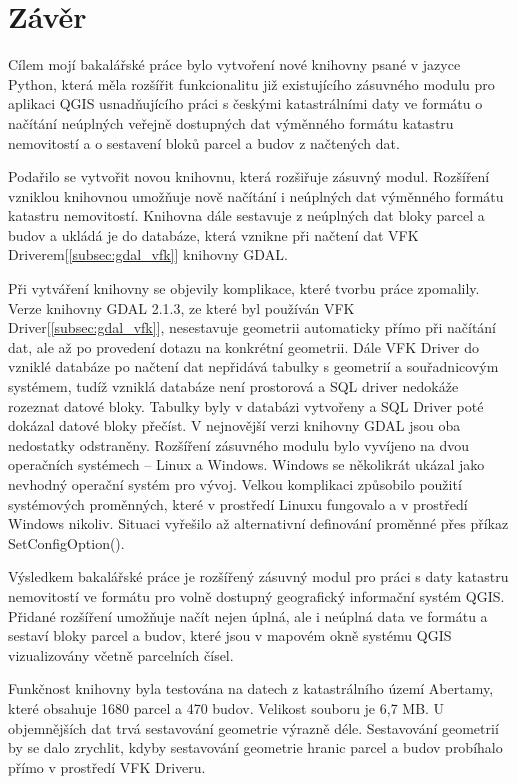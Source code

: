 \chapter{Závěr}
\label{5-zaver}
Cílem mojí bakalářské práce bylo vytvoření nové knihovny psané v jazyce Python, která měla rozšířit funkcionalitu již existujícího zásuvného modulu pro aplikaci QGIS usnadňujícího práci s českými katastrálními daty ve formátu  o načítání neúplných veřejně dostupných dat výměnného formátu katastru nemovitostí a o sestavení bloků parcel a budov z načtených dat.

Podařilo se vytvořit novou knihovnu, která rozšiřuje zásuvný modul. Rozšíření vzniklou knihovnou umožňuje nově načítání i neúplných dat výměnného formátu katastru nemovitostí. Knihovna dále sestavuje z neúplných dat bloky parcel a budov a ukládá je do databáze, která vznikne při načtení dat VFK Driverem[\ref{subsec:gdal_vfk}] knihovny GDAL.

Při vytváření knihovny se objevily komplikace, které tvorbu práce zpomalily. Verze knihovny GDAL 2.1.3, ze které byl používán VFK Driver[\ref{subsec:gdal_vfk}], nesestavuje geometrii automaticky přímo při načítání dat, ale až po provedení dotazu na konkrétní geometrii. Dále VFK Driver do vzniklé databáze po načtení dat nepřidává tabulky s geometrií a souřadnicovým systémem, tudíž vzniklá databáze není prostorová a SQL driver nedokáže rozeznat datové bloky. Tabulky byly v databázi vytvořeny a SQL Driver poté dokázal datové bloky přečíst. V nejnovější verzi knihovny GDAL jsou oba nedostatky odstraněny. Rozšíření zásuvného modulu bylo vyvíjeno na dvou operačních systémech -- Linux a Windows. Windows se několikrát ukázal jako nevhodný operační systém pro vývoj. Velkou komplikaci způsobilo použití systémových proměnných, které v prostředí Linuxu fungovalo a v prostředí Windows nikoliv. Situaci vyřešilo až alternativní definování proměnné přes příkaz SetConfigOption().

Výsledkem bakalářské práce je rozšířený zásuvný modul pro práci s daty katastru nemovitostí ve formátu  pro volně dostupný geografický informační systém QGIS. Přidané rozšíření umožňuje načít nejen úplná, ale i neúplná data ve formátu  a sestaví bloky parcel a budov, které jsou v mapovém okně systému QGIS vizualizovány včetně parcelních čísel.

Funkčnost knihovny byla testována na datech z katastrálního území Abertamy, které obsahuje 1680 parcel a 470 budov. Velikost  souboru je 6,7 MB. U objemnějších dat trvá sestavování geometrie výrazně déle. Sestavování geometrií by se dalo zrychlit, kdyby sestavování geometrie hranic parcel a budov probíhalo přímo v prostředí VFK Driveru. %

